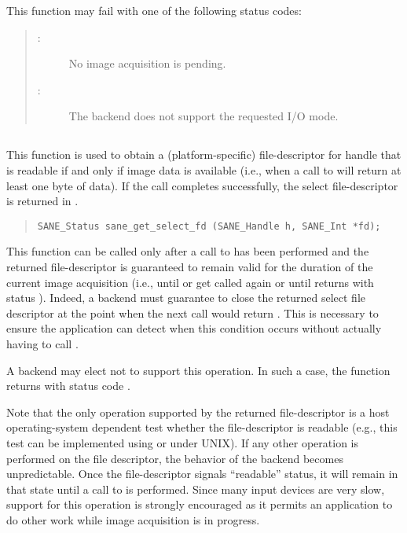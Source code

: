 \documentclass[11pt,DVIps]{report}
\begin{document}
This function may fail with one of the following status codes:
\begin{quote}
\begin{description}
\item[:] No image acquisition is pending.
\item[:] The backend does not support
the requested I/O mode.
\end{description}
\end{quote}


\subsection{}

This function is used to obtain a (platform-specific) file-descriptor
for handle  that is readable if and only if image data is
available (i.e., when a call to  will return at
least one byte of data).  If the call completes successfully, the
select file-descriptor is returned in .
\begin{quote}
\begin{verbatim}
SANE_Status sane_get_select_fd (SANE_Handle h, SANE_Int *fd);
\end{verbatim}
\end{quote}
This function can be called only after a call to 
has been performed and the returned file-descriptor is guaranteed to
remain valid for the duration of the current image acquisition (i.e.,
until  or  get called again
or until  returns with status
).  Indeed, a backend must guarantee to
close the returned select file descriptor at the point when the next
 call would return .
This is necessary to ensure the application can detect when this
condition occurs without actually having to call .

A backend may elect not to support this operation.  In such a case,
the function returns with status code
.

Note that the only operation supported by the returned file-descriptor
is a host operating-system dependent test whether the file-descriptor
is readable (e.g., this test can be implemented using 
or  under UNIX).  If any other operation is performed on
the file descriptor, the behavior of the backend becomes
unpredictable.  Once the file-descriptor signals ``readable'' status,
it will remain in that state until a call to  is
performed.  Since many input devices are very slow, support for this
operation is strongly encouraged as it permits an application to do
other work while image acquisition is in progress.
\end{document}
